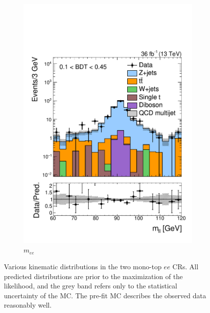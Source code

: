 \begin{figure}[]
\begin{center}
\begin{subfigure}[t]{0.32\textwidth}
            \includegraphics[width=\textwidth]{figures/monotop/prefit/dielectron_loose_diLepMass_logy.pdf}
            \caption{$m_{ee}$}
        \end{subfigure}
        \caption{Various kinematic distributions in the two mono-top $ee$ CRs. 
                 All predicted distributions are prior to the maximization of the likelihood, and the grey band refers only to the statistical uncertainty of the MC.
                 The pre-fit MC describes the observed data reasonably well.
        }
        \label{fig:mt:prefit_dielectron}
    \end{center}
\end{figure}

